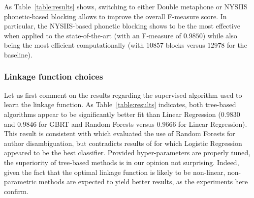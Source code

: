 \documentclass[runningheads,a4paper]{llncs}
\begin{document}
As Table~\ref{table:results} shows, switching to either Double metaphone or NYSIIS phonetic-based blocking allows
to improve the overall F-measure score.
In particular, the NYSIIS-based phonetic blocking shows to be the most effective when applied
to the state-of-the-art (with an F-measure of $0.9850$) while also being the most
efficient computationally (with 10857 blocks versus 12978 for the baseline).



\subsubsection{Linkage function choices}
\label{choices:linkage}
Let us first comment on the results regarding the
supervised algorithm used to learn the linkage function.
As Table~\ref{table:results} indicates, both tree-based algorithms appear to be
significantly better fit than Linear Regression ($0.9830$ and $0.9846$ for GBRT
and Random Forests versus $0.9666$ for Linear Regression). This result is
consistent with \cite{treeratpituk2009disambiguating} which evaluated the use of
Random Forests for author disambiguation, but contradicts results of
\cite{levin2012citation} for which Logistic Regression appeared to be the best
classifier.
Provided hyper-parameters are properly tuned, the superiority of
tree-based methods is in our opinion not surprising.
Indeed, given the fact that the optimal linkage function is likely to be non-linear, non-parametric
methods are expected to yield better results, as the experiments here confirm.
\end{document}
